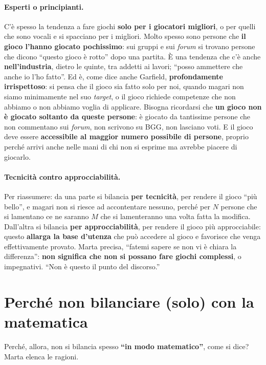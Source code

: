 \paragraph{Esperti o principianti.} C'è spesso la tendenza a fare giochi \textbf{solo per i
giocatori migliori}, o per quelli che sono vocali e si spacciano per i migliori. Molto spesso
sono persone che \textbf{il gioco l'hanno giocato pochissimo}: sui gruppi e sui \emph{forum}
si trovano persone che dicono ``questo gioco è rotto'' dopo una partita. È una tendenza che
c'è anche \textbf{nell'industria}, dietro le quinte, tra addetti ai lavori; ``posso ammettere
che anche io l'ho fatto''. Ed è, come dice anche Garfield, \textbf{profondamente
irrispettoso}: si pensa che il gioco sia fatto solo per noi, quando magari non siamo
minimamente nel suo \emph{target}, o il gioco richiede competenze che non abbiamo o non
abbiamo voglia di applicare. Bisogna ricordarsi che \textbf{un gioco non è giocato soltanto
da queste persone}: è giocato da tantissime persone che non commentano sui \emph{forum}, non
scrivono su BGG, non lasciano voti. E il gioco deve essere \textbf{accessibile al maggior
numero possibile di persone}, proprio perché arrivi anche nelle mani di chi non si esprime ma
avrebbe piacere di giocarlo.

\paragraph{Tecnicità contro approcciabilità.} Per riassumere: da una parte si bilancia
\textbf{per tecnicità}, per rendere il gioco ``più bello'', e magari non si riesce ad
accontentare nessuno, perché per $N$ persone che si lamentano ce ne saranno $M$ che si
lamenteranno una volta fatta la modifica. Dall'altra si bilancia \textbf{per
approcciabilità}, per rendere il gioco più approcciabile: questo \textbf{allarga la base
d'utenza} che può accedere al gioco e favorisce che venga effettivamente provato. Marta
precisa, ``fatemi sapere se non vi è chiara la differenza'': \textbf{non significa che non si
possano fare giochi complessi}, o impegnativi. ``Non è questo il punto del discorso.''

\section{Perché non bilanciare (solo) con la matematica}
\label{a14:sec:matematica}

Perché, allora, non si bilancia spesso \textbf{``in modo matematico''}, come si dice? Marta
elenca le ragioni.

